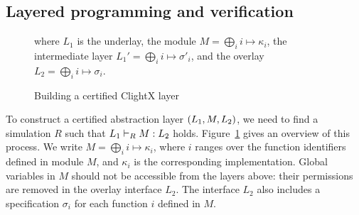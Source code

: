 \subsection{Layered programming and verification}
\label{sec:clightx-prog}

\begin{figure}[t]
    \begin{prooftree}
    \end{prooftree}
    where $L_1$ is the underlay, the module $M = \bigoplus_i i \mapsto \kappa_i$, the intermediate layer $L_1' = \bigoplus_i i \mapsto \sigma'_i$, and the overlay $L_2 = \bigoplus_i i \mapsto \sigma_i$.
    \caption{Building a certified ClightX layer}
    \label{fig:lprooftree}
    \afterpage{\FloatBarrier}
\end{figure}

To construct a certified abstraction layer $\layer{L_1}{M}{L_2}$, we
need to find a simulation $R$ such that $\ltyp{L_1}{R}{M}{L_2}$ holds.
Figure~\ref{fig:lprooftree} gives an overview of this process.  We write
$M = \bigoplus_i i \mapsto \kappa_i$, where $i$ ranges over the
function identifiers defined in module $M$, and $\kappa_i$ is the
corresponding implementation.  Global variables in $M$ should not
be accessible from the layers above: their permissions are removed in
the overlay interface $L_2$.  The interface $L_2$ also includes a
specification $\sigma_i$ for each function $i$ defined in $M$.

